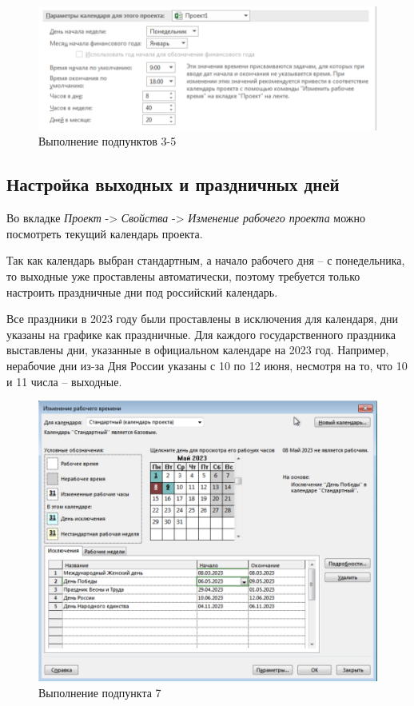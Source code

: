 \FloatBarrier
\begin{figure}[h]	
	\begin{center}
		\includegraphics[width=\linewidth]{inc/1-3.png}
	\end{center}
	\captionsetup{justification=centering}
	\caption{Выполнение подпунктов 3-5}
\end{figure}
\FloatBarrier


\subsection*{Настройка выходных и праздничных дней}
Во вкладке \textit{Проект} -> \textit{Свойства} -> \textit{Изменение рабочего проекта} можно посмотреть текущий календарь проекта.

Так как календарь выбран стандартным, а начало рабочего дня -- с понедельника, то выходные уже проставлены автоматически, поэтому требуется только настроить праздничные дни под российский календарь.

Все праздники в 2023 году были проставлены в исключения для календаря, дни указаны на графике как праздничные.
Для каждого государственного праздника выставлены дни, указанные в официальном календаре на 2023 год. 
Например, нерабочие дни из-за Дня России указаны с 10 по 12 июня, несмотря на то, что 10 и 11 числа -- выходные.

\FloatBarrier
\begin{figure}[h]	
	\begin{center}
		\includegraphics[width=\linewidth]{inc/1-7.png}
	\end{center}
	\captionsetup{justification=centering}
	\caption{Выполнение подпункта 7}
\end{figure}
\FloatBarrier

